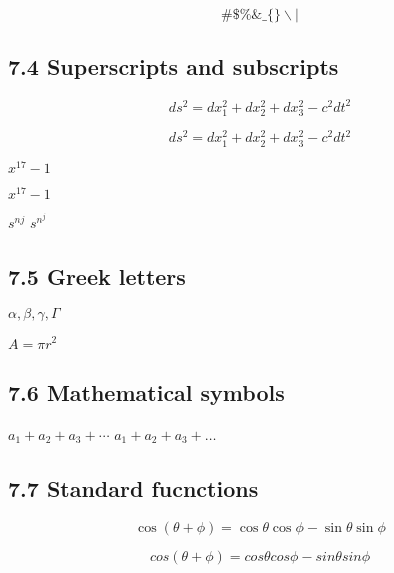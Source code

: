 \documentclass{article} %
\begin{document}
\[
\# \$ \% \& \_ \{ \} \backslash |
\]

\subsection*{7.4 Superscripts and subscripts}

\[
ds^2 = dx_1^2 + dx_2^2 + dx_3^2 - c^2 dt^2  
\]


\[
ds^2 = dx^2_1 + dx^2_2 + dx^2_3 - c^2 dt^2  
\]

$x^17 -1$

$x^{17}-1$


          
$s^{n j}$
$s^{n^j}$

\subsection*{7.5 Greek letters}


$\alpha,\beta,\gamma, \Gamma$

$A = \pi r^2$


\subsection*{7.6 Mathematical symbols}

$a_1+a_2+a_3+\cdots$ %
$a_1+a_2+a_3+\ldots$ %


\subsection*{7.7 Standard fucnctions}

\[
\cos(\theta+\phi)=\cos \theta \cos \phi - \sin \theta \sin \phi
\]

\[
cos(\theta+\phi)=cos \theta cos \phi - sin \theta sin \phi
\]
\end{document}

